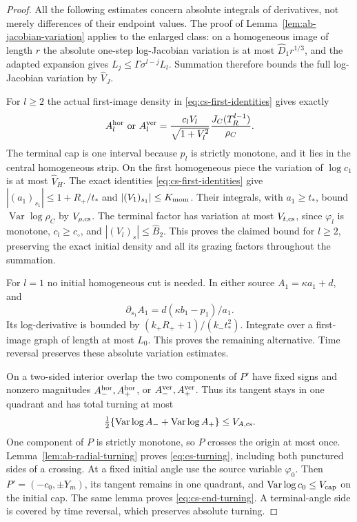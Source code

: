 \begin{proof}
All the following estimates concern absolute integrals of derivatives,
not merely differences of their endpoint values.  The proof of
Lemma~\ref{lem:ab-jacobian-variation} applies to the enlarged class:
on a homogeneous image of length $r$ the absolute one-step log-Jacobian
variation is at most $\widehat D_1 r^{1/3}$, and the adapted expansion
gives $L_j\le\Gamma\sigma^{l-j}L_l$.  Summation therefore bounds
the full log-Jacobian variation by $\widehat V_J$.

For $l\ge2$ the actual first-image density in
\eqref{eq:cs-first-identities} gives exactly
\[
 A_l^{\rm hor}\ \hbox{or}\ A_l^{\rm ver}
   =\frac{c_lV_l}{\sqrt{1+V_l^2}}
                           \frac{J_C(T_R^{l-1})}{\rho_C}.
\]
The terminal cap is one interval because $p_l$ is strictly monotone,
and it lies in the central homogeneous strip.  On the first homogeneous
piece the variation of $\log c_1$ is at most $\widehat V_H$.
The exact identities \eqref{eq:cs-first-identities} give
$|(a_1)_{s_1}|\le1+R_+/t_*$ and $|(V_1)_{s_1}|\le K_{\rm mom}$.
Their integrals, with $a_1\ge t_*$, bound
$\operatorname{Var}\log\rho_C$ by $V_{\rho,\rm cs}$.
The terminal factor has variation at most $V_{t,\rm cs}$, since
$\varphi_l$ is monotone, $c_l\ge c_\circ$, and
$|(V_l)_s|\le\widehat B_2$.  This proves the claimed bound for
$l\ge2$, preserving the exact initial density and all its grazing
factors throughout the summation.

For $l=1$ no initial homogeneous cut is needed.  In either source
$A_1=\kappa a_1+d$, and
\[
       \partial_{s_1}A_1=d(\kappa b_1-p_1)/a_1.
\]
Its log-derivative is bounded by
$(k_+R_++1)/(k_-t_*^2)$.  Integrate over a first-image graph of
length at most $L_0$.  This proves the remaining alternative.
Time reversal preserves these absolute variation estimates.

On a two-sided interior overlap the two components of $P'$ have
fixed signs and nonzero magnitudes $A_-^{\rm hor},A_+^{\rm hor}$,
or $A_-^{\rm ver},A_+^{\rm ver}$.  Thus its tangent stays in one
quadrant and has total turning at most
\[
 \tfrac12\{\operatorname{Var}\log A_-+
                    \operatorname{Var}\log A_+\}\le V_{A,\rm cs}.
\]
One component of $P$ is strictly monotone, so $P$ crosses the origin
at most once.  Lemma~\ref{lem:ab-radial-turning} proves
\eqref{eq:cs-turning}, including both punctured sides of a crossing.
At a fixed initial angle use the source variable $\varphi_0$.
Then $P'=(-c_0,\pm Y_m)$, its tangent remains in one quadrant, and
$\operatorname{Var}\log c_0\le V_{\rm cap}$ on the initial cap.
The same lemma proves \eqref{eq:cs-end-turning}.  A terminal-angle
side is covered by time reversal, which preserves absolute turning.
\end{proof}

